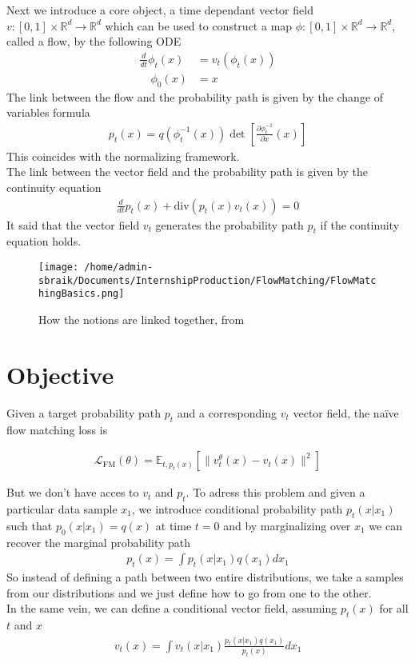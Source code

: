 \documentclass{article}
\begin{document}
\newpage

Next we introduce a core object, a time dependant vector field \(v:[0,1]\times \mathbb{R}^d\rightarrow\mathbb{R}^d\) which can be used to construct a map \(\phi:[0,1]\times\mathbb{R}^d\rightarrow\mathbb{R}^d\), called a flow, by the following ODE
\begin{align}
    \frac{d}{dt}\phi_t(x)&=v_t(\phi_t(x))\\
    \quad \phi_0(x)&=x \nonumber
\end{align}  
The link between the flow and the probability path is given by the change of variables formula 
\begin{align}
    p_t(x)=q(\phi_t^{-1}(x))\det \left[\frac{\partial\phi_t^{-1}}{\partial x}(x)\right]
\end{align}
This coincides with the normalizing framework. \\
The link between the vector field and the probability path is given by the continuity equation 
\begin{align}
  \frac{d}{dt}p_t(x)+\text{div}(p_t(x)v_t(x))=0
\end{align}
It said that the vector field \(v_t\) generates the probability path \(p_t\) if the continuity equation holds.\\
\bigskip
\begin{figure}[h]
    \centering
    \texttt{[image: /home/admin-sbraik/Documents/InternshipProduction/FlowMatching/FlowMatchingBasics.png]}
    \caption{How the notions are linked together, from \cite{lipman2024flowmatchingguidecode}}
    \label{fig:flow_matching_basics}
\end{figure}

\section{Objective}
Given a target probability path \(p_t\) and a corresponding \(v_t\) vector field, the naïve flow matching loss is 

\begin{align}
    \mathcal{L}_\text{FM}(\theta) = \mathbb{E}_{t,p_t(x)}\left[\|v_t^\theta(x)-v_t(x)\|^2\right]
\end{align}

But we don't have acces to \(v_t\) and \(p_t\). To adress this problem and given a particular data sample \(x_1\), we introduce conditional probability path \(p_t(x|x_1)\) such that \(p_0(x|x_1)=q(x)\) at time \(t=0\) and by marginalizing over \(x_1\) we can recover the marginal probability path  
\begin{align}
  p_t(x)=\int p_t(x|x_1)q(x_1)dx_1
\end{align}
So instead of defining a path between two entire distributions, we take a samples from our distributions and we just define how to go from one to the other.\\ 
In the same vein, we can define a conditional vector field, assuming \(p_t(x)\) for all \(t\) and \(x\) 
\begin{align}
  v_t(x)=\int v_t(x|x_1)\frac{p_t(x|x_1)q(x_1)}{p_t(x)}dx_1
\end{align}
\end{document}
